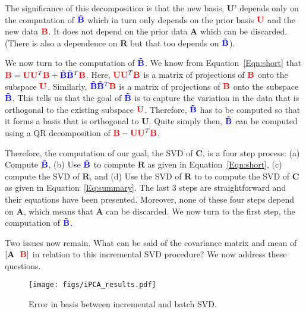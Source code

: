 The significance of this decomposition is that the new basis, $\mathbf{U'}$ depends only on the computation of ${\color{blue}\mathbf{\tilde{B}}}$ which in turn only depends on the prior basis ${\color{red}\mathbf{U}}$ and the new data  ${\color{red}\mathbf{B}}$.  It does not depend on the prior data $\mathbf{A}$ which can be discarded.  (There is also a dependence on $\mathbf{R}$ but that too depends on ${\color{blue}\mathbf{\tilde{B}}}$).

We now turn to the computation of $ {\color{blue}\mathbf{\tilde{B}}}$.  We know from Equation~\ref{Eqn:short} that ${\color{red}\mathbf{B}}={\color{red}\mathbf{U}}{\color{red}\mathbf{U}}^T{\color{red}\mathbf{B}} + {\color{blue}\mathbf{\tilde{B}}} {{\color{blue}\mathbf{\tilde{B}}}^T}{\color{red}\mathbf{B}}$.  Here, ${\color{red}\mathbf{U}}{\color{red}\mathbf{U}}^T{\color{red}\mathbf{B}}$ is a matrix of projections of ${\color{red}\mathbf{B}}$ onto the subspace ${\color{red}\mathbf{U}}$.  Similarly, ${\color{blue}\mathbf{\tilde{B}}} {\color{blue}\mathbf{\tilde{B}}^T}{\color{red}\mathbf{B}}$ is a matrix of projections of ${\color{red}\mathbf{B}}$ onto the subspace ${\color{blue}\mathbf{\tilde{B}}}$.  This tells us that the goal of ${\color{blue}\mathbf{\tilde{B}}}$ is to capture the variation in the data that is orthogonal to the existing subspace ${\color{red}\mathbf{U}}$.  Therefore, ${\color{blue}\mathbf{\tilde{B}}}$ has to be computed so that it forms a basis that is orthogonal to $\mathbf{U}$.  Quite simply then, ${\color{blue}\mathbf{\tilde{B}}}$ can be computed using a QR decomposition of ${\color{red}\mathbf{B}}-{\color{red}\mathbf{U}}{\color{red}\mathbf{U}}^T{\color{red}\mathbf{B}}$. 

Therefore, the computation of our goal, the SVD of $\mathbf{C}$, is a four step process: (a) Compute ${\color{blue}\mathbf{\tilde{B}}}$, (b) Use ${\color{blue}\mathbf{\tilde{B}}}$ to compute $\mathbf{R}$ as given in Equation~\ref{Eqn:short}, (c) compute the SVD of $\mathbf{R}$, and (d) Use the SVD of $\mathbf{R}$ to to compute the SVD of $\mathbf{C}$ as given in Equation~\ref{Eq:summary}.  The last 3 steps are straightforward and their equations have been presented.  Moreover, none of these four steps depend on $\mathbf{A}$, which means that $\mathbf{A}$ can be discarded.  We now turn to the first step, the computation of $ {\color{blue}\mathbf{\tilde{B}}}$.   

Two issues now remain.  What can be said of the covariance matrix and mean of $\left[{\mathbf{A}} \ \ {\color{red}{\color{red}\mathbf{B}}}\right]$ in relation to this incremental SVD procedure?  We now address these questions.
								\begin{figure}[t]
								\centering
								\texttt{[image: figs/iPCA\_results.pdf]}
								\caption{Error in basis between incremental and batch SVD.}
								\label{iPCA_results}
								\end{figure}



